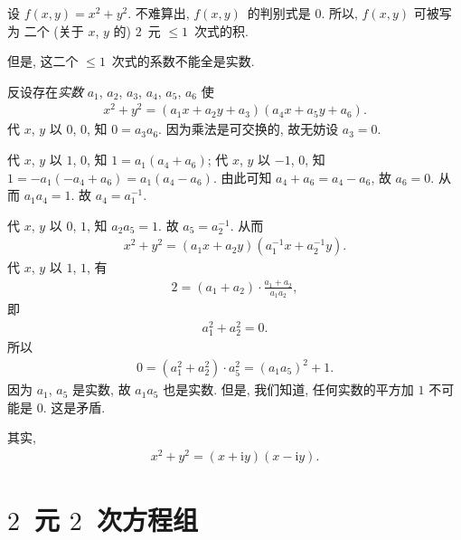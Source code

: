 \begin{example}
    设 \(f(x, y) = x^2 + y^2\).
    不难算出, \(f(x, y)\)~的判别式是 \(0\).
    所以, \(f(x, y)\) 可被写为%
    二个 (关于 \(x\), \(y\) 的)
    \(2\)~元 \({\leq} 1\)~次式的积.

    但是, 这二个 \({\leq} 1\)~次式的系数不能全是实数.

    反设存在\emph{实数}
    \(a_1\), \(a_2\), \(a_3\), \(a_4\), \(a_5\), \(a_6\) 使
    \begin{align*}
        x^2 + y^2 = (a_1 x + a_2 y + a_3) (a_4 x + a_5 y + a_6).
    \end{align*}
    代 \(x\), \(y\) 以 \(0\), \(0\), 知 \(0 = a_3 a_6\).
    因为乘法是可交换的, 故无妨设 \(a_3 = 0\).

    代 \(x\), \(y\) 以 \(1\), \(0\), 知
    \(1 = a_1 (a_4 + a_6)\);
    代 \(x\), \(y\) 以 \(-1\), \(0\), 知
    \(1 = -a_1 (-a_4 + a_6) = a_1 (a_4 - a_6)\).
    由此可知 \(a_4 + a_6 = a_4 - a_6\),
    故 \(a_6 = 0\).
    从而 \(a_1 a_4 = 1\).
    故 \(a_4 = a_1^{-1}\).

    代 \(x\), \(y\) 以 \(0\), \(1\), 知 \(a_2 a_5 = 1\).
    故 \(a_5 = a_2^{-1}\).
    从而
    \begin{align*}
        x^2 + y^2 = (a_1 x + a_2 y) (a_1^{-1} x + a_2^{-1} y).
    \end{align*}
    代 \(x\), \(y\) 以 \(1\), \(1\), 有
    \begin{align*}
        2 = (a_1 + a_2) \cdot \frac{a_1 + a_2}{a_1 a_2},
    \end{align*}
    即
    \begin{align*}
        a_1^2 + a_2^2 = 0.
    \end{align*}
    所以
    \begin{align*}
        0
        = (a_1^2 + a_2^2) \cdot a_5^2
        = (a_1 a_5)^2 + 1.
    \end{align*}
    因为 \(a_1\), \(a_5\) 是实数, 故 \(a_1 a_5\) 也是实数.
    但是, 我们知道,
    任何实数的平方加 \(1\) 不可能是 \(0\).
    这是矛盾.

    其实,
    \begin{align*}
        x^2 + y^2 = (x + \mathrm{i} y) (x - \mathrm{i} y).
    \end{align*}
\end{example}

\section{\texorpdfstring{\(2\)~元 \(2\)~次方程组}%
  {2 元 2 次方程组}}


